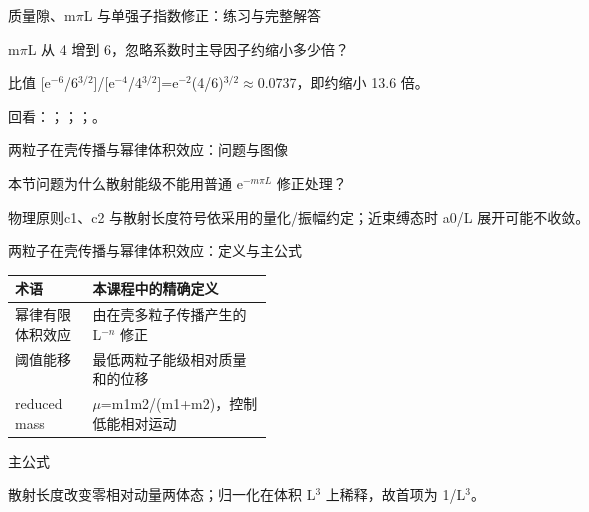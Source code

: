 \begin{frame}[t]{质量隙、m\ensuremath{\pi}L 与单强子指数修正：练习与完整解答}
\footnotesize
\begin{block}{}m\ensuremath{\pi}L 从 4 增到 6，忽略系数时主导因子约缩小多少倍？\end{block}
\begin{exampleblock}{}比值 [e\ensuremath{^{-6}}/\allowbreak{}6\ensuremath{^{3/2}}]/\allowbreak{}[e\ensuremath{^{-4}}/\allowbreak{}4\ensuremath{^{3/2}}]=e\ensuremath{^{-2}}(4/\allowbreak{}6)\ensuremath{^{3/2}}\ensuremath{\approx}0.0737，即约缩小 13.6 倍。\end{exampleblock}
\vfill
\scriptsize 回看：；；；。
\end{frame}

\begin{frame}[t]{两粒子在壳传播与幂律体积效应：问题与图像}
\footnotesize
\begin{block}{本节问题}为什么散射能级不能用普通 e\ensuremath{^{-m\pi{}L}} 修正处理？\end{block}
\begin{block}{物理原则}\quad c1、c2 与散射长度符号依采用的量化/\allowbreak{}振幅约定；近束缚态时 a0/\allowbreak{}L 展开可能不收敛。\end{block}
\end{frame}

\begin{frame}[t]{两粒子在壳传播与幂律体积效应：定义与主公式}
\footnotesize\begin{tabularx}{\linewidth}{p{0.30\linewidth}Y}
\toprule 术语 & 本课程中的精确定义\\\midrule
{} 幂律有限体积效应 & 由在壳多粒子传播产生的 L\ensuremath{^{-n}} 修正\\
 阈值能移 & 最低两粒子能级相对质量和的位移\\
 reduced mass & \ensuremath{\mu}=m1m2/\allowbreak{}(m1+m2)，控制低能相对运动\\
\bottomrule\end{tabularx}\vspace{0.15cm}
\begin{block}{ 主公式}\centering{}\end{block}
散射长度改变零相对动量两体态；归一化在体积 L\ensuremath{^{3}} 上稀释，故首项为 1/\allowbreak{}L\ensuremath{^{3}}。
\end{frame}

